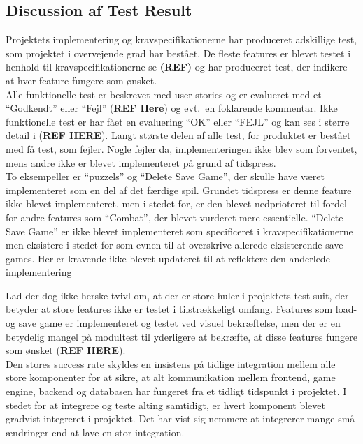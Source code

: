 \subsection{Discussion af Test Result}
Projektets implementering og kravspecifikationerne har produceret adskillige test, som 
projektet i overvejende grad har bestået. De fleste features er blevet
testet i henhold til kravspecifikationerne se \textbf{(REF)} og har produceret 
test, der indikere at hver feature fungere som ønsket. \\

Alle funktionelle test er beskrevet med user-stories og er evalueret med et ``Godkendt''
eller ``Fejl'' (\textbf{REF Here}) og evt.\ en foklarende kommentar. Ikke funktionelle 
test er har fået en evaluering ``OK'' eller ``FEJL'' og kan ses i større detail i (\textbf{REF HERE}).
Langt største delen af alle test, for produktet er bestået med få test, som fejler. 
Nogle fejler da, implementeringen ikke blev som forventet, mens andre ikke er blevet 
implementeret på grund af tidspress. \\

To eksempeller er ``puzzels'' og ``Delete Save Game'', der skulle have været implementeret som en del af det færdige spil.
Grundet tidspress er denne feature ikke blevet implementeret, men i stedet for, er den blevet
nedprioteret til fordel for andre features som ``Combat'', der blevet vurderet mere essentielle.
``Delete Save Game'' er ikke blevet implementeret som specificeret i kravspecifikationerne men
eksistere i stedet for som evnen til at overskrive allerede eksisterende save games. Her er 
kravende ikke blevet updateret til at reflektere den anderlede implementering

Lad der dog ikke herske tvivl om, at der er store huler i projektets test suit, der
betyder at store features ikke er testet i tilstrækkeligt omfang. Features som load- og save
game er implementeret og testet ved visuel bekræftelse, men der er en betydelig mangel på
modultest til yderligere at bekræfte, at disse features fungere som ønsket (\textbf{REF HERE}). \\

Den stores success rate skyldes en insistens på tidlige integration mellem alle store komponenter for at sikre, at 
alt kommunikation mellem frontend, game engine, backend og databasen har fungeret fra et tidligt 
tidspunkt i projektet. I stedet for at integrere og teste alting samtidigt, er hvert komponent 
blevet gradvist integreret i projektet. Det har vist sig nemmere at integrerer mange små ændringer
end at lave en stor integration.





